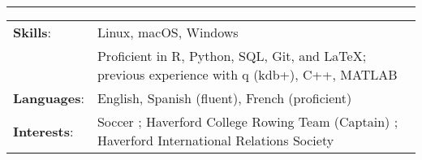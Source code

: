 \documentclass[paper=a4, fontsize=11pt]{scrartcl} %
\begin{document}
\vspace{-3mm}
\rule{\textwidth}{0.4pt}

\vspace{1.5mm}

\begin{tabularx}{\linewidth}{ll}

\hspace{-3mm}
\textbf{Skills}: & Linux, macOS, Windows \\
  & Proficient in R, Python, SQL, Git, and \LaTeX; previous experience with q (kdb+), C++, MATLAB\\[1mm]

\hspace{-3mm}
\textbf{Languages}: & English, Spanish (fluent), French (proficient) \\
[1mm]



\hspace{-3mm}
\textbf{Interests}: & Soccer ; Haverford College Rowing Team (Captain) ; Haverford International Relations Society \\ [1mm]


\end{tabularx}
\end{document}
